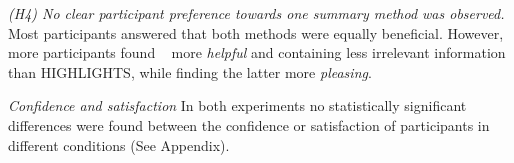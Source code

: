 
\emph{(H4) No clear participant preference towards one summary method was observed.} Most participants answered that both methods were equally beneficial. However,
more participants found \disalg~ more \emph{helpful} and containing less irrelevant information than HIGHLIGHTS, while finding the latter more \emph{pleasing}.





\emph{Confidence and satisfaction}
In both experiments no statistically significant differences were found between the confidence or satisfaction of participants in different conditions (See Appendix).





